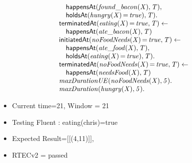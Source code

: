 \documentclass[8pt]{beamer}
\DeclareMathOperator{\val}{=}  %
\def \patsize {}
\def\happensAt{\textsf{\patsize happensAt}}
\def\holdsAt{\textsf{\patsize holdsAt}}
\def\initiatedAt{\textsf{\patsize initiatedAt}}
\def\terminatedAt{\textsf{\patsize terminatedAt}}
\newenvironment{mysplit}%
  {\arraycolsep 0pt \begin{array}{l}}%
  {\end{array}}
\begin{document}
\begin{frame}
\begin{minipage}{0.55\linewidth}
\begin{align*}
\begin{mysplit}
                \quad    \happensAt\mathit{(found\_bacon(X),T),}\\
                \quad    \holdsAt\mathit{(hungry(X)\val true),T).}\\
                \terminatedAt\mathit{(eating(X)\val true,T)\leftarrow}\\
                \quad    \happensAt\mathit{(ate\_bacon(X),T)}\\
                \initiatedAt\mathit{(noFoodNeeds(X)\val true,T)\leftarrow}\\
                \quad    \happensAt\mathit{(ate\_food(X),T),}\\
                \quad    \holdsAt\mathit{(eating(X)\val true),T).}\\
                \terminatedAt\mathit{(noFoodNeeds(X)\val true,T)\leftarrow}\\
                \quad    \happensAt\mathit{(needsFood(X),T)}\\
                \mathit{maxDurationUE(noFoodNeeds(X),5).}\\
                \mathit{maxDuration(hungry(X),5).}\\
            \end{mysplit}
        \end{align*}
    \end{minipage}
    \begin{itemize}
        \item Current time=21, Window = 21
        \item Testing Fluent :  eating(chris)=true
        \item Expected Result=[[(4,11)]],
        \item RTECv2 = passed
    \end{itemize}
\end{frame}
\end{document}
